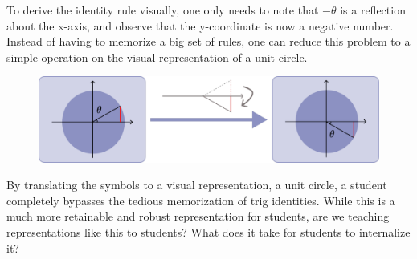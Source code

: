 To derive the identity rule visually, one only needs to note that $-\theta$ is a reflection about the x-axis, and observe that the y-coordinate is now a negative number. Instead of having to memorize a big set of rules, one can reduce this problem to a simple operation on the visual representation of a unit circle.

\vspace{10pt}
\begin{figure}[h]
    \centering
    \includegraphics[width=0.70\linewidth]{assets/prelude/visual-transform.pdf}
\end{figure}

By translating the symbols to a visual representation, a unit circle, a student completely bypasses the tedious memorization of trig identities. While this is a much more retainable and robust representation for students, are we teaching representations like this to students? What does it take for students to internalize it? 
